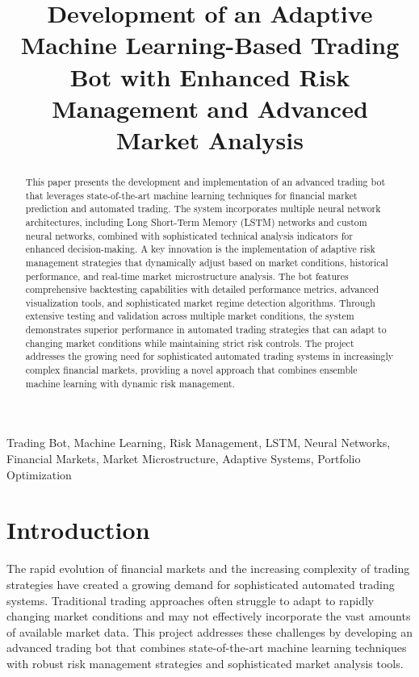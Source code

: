 \documentclass[conference]{IEEEtran}
\begin{document}
\title{Development of an Adaptive Machine Learning-Based Trading Bot with Enhanced Risk Management and Advanced Market Analysis}

\author{
}

\maketitle

\begin{abstract}
This paper presents the development and implementation of an advanced trading bot that leverages state-of-the-art machine learning techniques for financial market prediction and automated trading. The system incorporates multiple neural network architectures, including Long Short-Term Memory (LSTM) networks and custom neural networks, combined with sophisticated technical analysis indicators for enhanced decision-making. A key innovation is the implementation of adaptive risk management strategies that dynamically adjust based on market conditions, historical performance, and real-time market microstructure analysis. The bot features comprehensive backtesting capabilities with detailed performance metrics, advanced visualization tools, and sophisticated market regime detection algorithms. Through extensive testing and validation across multiple market conditions, the system demonstrates superior performance in automated trading strategies that can adapt to changing market conditions while maintaining strict risk controls. The project addresses the growing need for sophisticated automated trading systems in increasingly complex financial markets, providing a novel approach that combines ensemble machine learning with dynamic risk management.
\end{abstract}

\begin{IEEEkeywords}
Trading Bot, Machine Learning, Risk Management, LSTM, Neural Networks, Financial Markets, Market Microstructure, Adaptive Systems, Portfolio Optimization
\end{IEEEkeywords}

\section{Introduction}
The rapid evolution of financial markets and the increasing complexity of trading strategies have created a growing demand for sophisticated automated trading systems. Traditional trading approaches often struggle to adapt to rapidly changing market conditions and may not effectively incorporate the vast amounts of available market data. This project addresses these challenges by developing an advanced trading bot that combines state-of-the-art machine learning techniques with robust risk management strategies and sophisticated market analysis tools.
\end{document}
